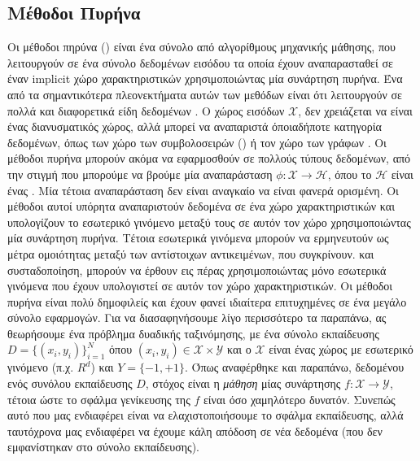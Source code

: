 \subsection{Μέθοδοι Πυρήνα}
Οι μέθοδοι πηρύνα () είναι ένα σύνολο από αλγορίθμους μηχανικής μάθησης, που λειτουργούν σε ένα σύνολο δεδομένων εισόδου τα οποία έχουν αναπαρασταθεί σε έναν implicit χώρο χαρακτηριστικών χρησιμοποιώντας μία συνάρτηση πυρήνα. Ένα από τα σημαντικότερα πλεονεκτήματα αυτών των μεθόδων είναι ότι λειτουργούν σε πολλά και διαφορετικά είδη δεδομένων \cite{ScholkopfSmolaLK}.
Ο χώρος εισόδων $\mathcal{X}$, δεν χρειάζεται να είναι ένας διανυσματικός χώρος, αλλά μπορεί να αναπαριστά όποιαδήποτε κατηγορία δεδομένων, όπως των χώρο των συμβολοσειρών () ή τον χώρο των γράφων \cite{GartnerSKSD}.
Οι μέθοδοι πυρήνα μπορούν ακόμα να εφαρμοσθούν σε πολλούς τύπους δεδομένων, από την στιγμή που μπορούμε να βρούμε μία αναπαράσταση $\phi : \mathcal{X} \rightarrow \mathcal{H}$, όπου το $\mathcal{H}$ είναι ένας .
Μία τέτοια αναπαράσταση δεν είναι αναγκαίο να είναι φανερά ορισμένη.
Οι μέθοδοι αυτοί υπόρητα αναπαριστούν δεδομένα σε ένα χώρο χαρακτηριστικών και υπολογίζουν το εσωτερικό γινόμενο μεταξύ τους σε αυτόν τον χώρο χρησιμοποιώντας μία συνάρτηση πυρήνα.
Τέτοια εσωτερικά γινόμενα μπορούν να ερμηνευτούν ως μέτρα ομοιότητας μεταξύ των αντίστοιχων αντικειμένων, που συγκρίνουν.
και συσταδοποίηση, μπορούν να έρθουν εις πέρας χρησιμοποιώντας μόνο εσωτερικά γινόμενα που έχουν υπολογιστεί σε αυτόν τον χώρο χαρακτηριστικών.
Οι μέθοδοι πυρήνα είναι πολύ δημοφιλείς και έχουν φανεί ιδιαίτερα επιτυχημένες σε ένα μεγάλο σύνολο εφαρμογών.
Για να διασαφηνήσουμε λίγο περισσότερο τα παραπάνω, ας θεωρήσουμε ένα πρόβλημα δυαδικής ταξινόμησης, με ένα σύνολο εκπαίδευσης $D = \{( x_{i}, y_{i})\}^{Ν}_{i = 1}$ όπου $(x_{i}, y_{i}) \in \mathcal{X} \times \mathcal{Y}$ και ο $\mathcal{X}$ είναι ένας χώρος με εσωτερικό γινόμενο (π.χ. $R^{d}$) και $Y = \{-1, +1\}$.
Όπως αναφέρθηκε και παραπάνω, δεδομένου ενός συνόλου εκπαίδευσης $D$, στόχος είναι η \textit{μάθηση} μίας συνάρτησης $f : \mathcal{X} \rightarrow \mathcal{Y}$, τέτοια ώστε το σφάλμα γενίκευσης της $f$ είναι όσο χαμηλότερο δυνατόν.
Συνεπώς αυτό που μας ενδιαφέρει είναι να ελαχιστοποιήσουμε το σφάλμα εκπαίδευσης, αλλά ταυτόχρονα μας ενδιαφέρει να έχουμε κάλη απόδοση σε νέα δεδομένα (που δεν εμφανίστηκαν στο σύνολο εκπαίδευσης).

